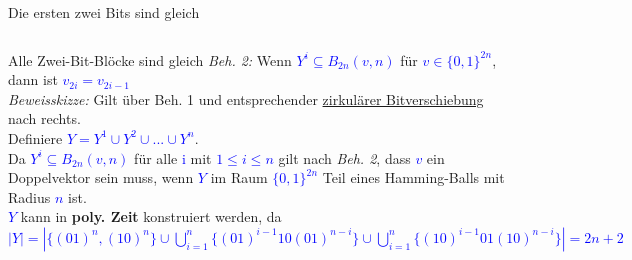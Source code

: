 \documentclass[10pt, aspectratio=169]{beamer}
\begin{document}
\begin{frame}{Die ersten zwei Bits sind gleich}
\begin{columns}[T]
    \begin{column}{0.5\textwidth}
    \end{column}
\end{columns}
\end{frame}
\begin{frame}{Alle Zwei-Bit-Blöcke sind gleich}
\textit{Beh. 2:} Wenn \textcolor{blue}{$Y^i \subseteq B_{2n}(v,n)$} für \textcolor{blue}{$v \in \{0,1\}^{2n}$}, dann ist \textcolor{blue}{$v_{2i} = v_{2i-1}$}\\
\textit{Beweisskizze:} Gilt über Beh. 1 und entsprechender \hyperlink{Versch}{\alert{zirkulärer Bitverschiebung}} nach rechts.\\
\vspace{1em}
Definiere \textcolor{blue}{$Y = Y^1 \cup Y^2 \cup ... \cup Y^n$}. \\Da \textcolor{blue}{$Y^i \subseteq B_{2n}(v,n)$} für alle \textcolor{blue}{i} mit \textcolor{blue}{$1\leq i\leq n$} gilt nach \textit{Beh. 2}, dass \textcolor{blue}{$v$} ein \alert{Doppelvektor} sein muss, wenn \textcolor{blue}{$Y$} im Raum \textcolor{blue}{$\{0,1\}^{2n}$} Teil eines Hamming-Balls mit Radius \textcolor{blue}{$n$} ist.\\
\vspace{1em}
\pause
\textcolor{blue}{$Y$} kann in \textbf{\alert{poly. Zeit}} konstruiert werden, da\\
\vspace{0.3em}
\textcolor{blue}{
    $|Y| = |\{(01)^n, (10)^n\} \cup \bigcup_{i=1}^{n} \{(01)^{i-1}10(01)^{n-i}\}
    \cup\bigcup_{i=1}^{n} \{(10)^{i-1}01(10)^{n-i}\}| = 2n+2$}
\end{frame}
\end{document}
